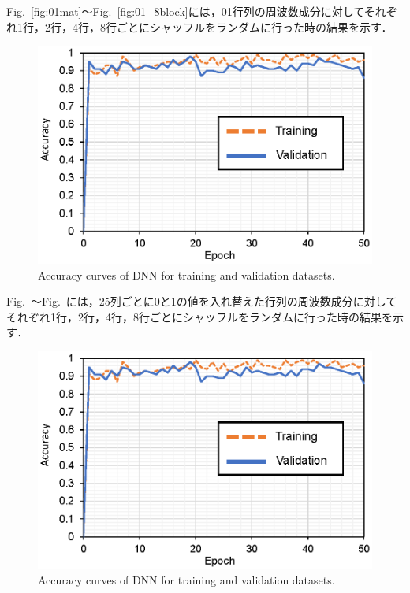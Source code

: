 Fig.~\ref{fig:01mat}〜Fig.~\ref{fig:01_8block}には，01行列の周波数成分に対してそれぞれ1行，2行，4行，8行ごとにシャッフルをランダムに行った時の結果を示す．


\begin{figure}[t]
    \begin{center}
        \includegraphics[width=0.85\columnwidth]{figures/accu.eps}
    \end{center}
    \vspace{-8pt}
	\caption{Accuracy curves of DNN for training and validation datasets.}
	\label{fig:25stripe_mat}
\end{figure}

Fig.~〜Fig.~には，25列ごとに0と1の値を入れ替えた行列の周波数成分に対してそれぞれ1行，2行，4行，8行ごとにシャッフルをランダムに行った時の結果を示す．
\begin{figure}[t]
    \begin{center}
        \includegraphics[width=0.85\columnwidth]{figures/accu.eps}
    \end{center}
    \vspace{-8pt}
	\caption{Accuracy curves of DNN for training and validation datasets.}
	\label{fig:stripe_mat}
\end{figure}

